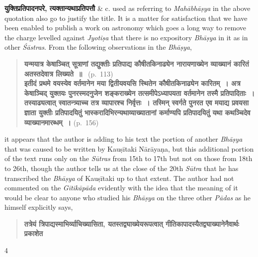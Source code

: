 \documentclass[11pt, openany]{book}
\begin{document}
 \textbf{युक्तिप्रतिपादनपरे, त्यक्तान्यथाप्रतिपत्तौ} {\en \& c. used as referring to \emph{Mahābhāṣya} in the above quotation also go to justify the title. It is a matter for satisfaction that we have been enabled to publish a work on astronomy which goes a long way to remove the charge levelled against \emph{Jyotiṣa} that there is no expository \emph{Bhāṣya} in it as in other \emph{Śāstras}. From the following observations in the \emph{Bhāṣya}},

\begin{quote} 
\textbf{यन्मयात्र केषाञ्चित् सूत्राणां तद्युक्तीः प्रतिपाद्य कौषीतकिनाढ्येन नारायणाख्येन व्याख्यानं कारितं अतस्तदेवात्र लिख्यते~॥} 
~(p.~113) \\

\textbf{इतीदं प्रथमे वयस्येव वर्तमानेन मया द्वितीयवयसि स्थितेन कौषीतकिनाढ्येन कारितम्~। अत्र केषाञ्चिद् युक्तयः पुनरस्मदनुजेन शङ्कराख्येन तत्समीपेऽध्यापयता वर्तमानेन तस्मै प्रतिपादिताः~। तस्याढ्यत्वात् स्वातन्त्र्याच्च तत्र व्यापारश्च निर्वृत्तः~। तस्मिन् स्वर्गते पुनरत एव मयाद्य प्रवयसा ज्ञाता युक्तीः प्रतिपादयितुं भास्करादिभिरन्यथाव्याख्यातानां कर्माण्यपि प्रतिपादयितुं यथा कथञ्चिदेव
व्याख्यानमारब्धम्~।}\hspace{5 cm} (p.~156)
\end{quote} 
{\en it appears that the author is adding to his text the portion of another \emph{Bhāṣya} that was caused to be written by Kauṣītaki Nārāyaṇa, but this additional portion of the text runs only on the \emph{Sūtras} from 15th to 17th but not on those from 18th to 26th, though the author tells us at the close of the 20th \emph{Sūtra} that he has transcribed the \emph{Bhāṣya} of Kauṣītaki up to that extent. The author had not commented on the \emph{Gītikāpāda} evidently with the idea that the meaning of it would be clear to anyone who studied his \emph{Bhāṣya} on the three other \emph{Pādas} as he himself explicitly says,}

\begin{quote} 
\textbf{तत्रेयं त्रिपाद्यस्माभिर्व्याचिख्यासिता, यतस्तद्व्याख्येयरूपत्वात् गीतिकापादस्यैतद्व्याख्यानेनैवार्थः प्रकाशेत}
\end{quote} 

\newpage

\begin{center} 4 \end{center}
\end{document}
